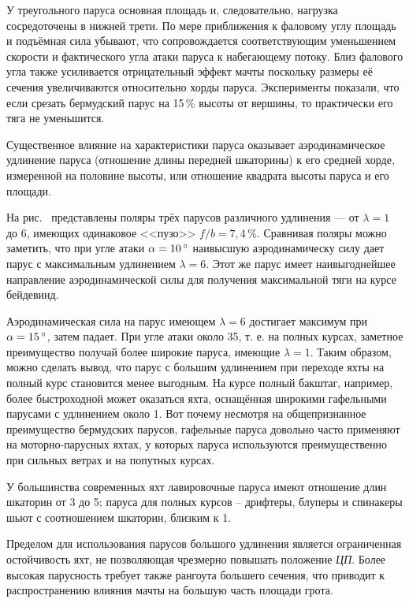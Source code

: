 У треугольного паруса основная площадь и, следовательно, нагрузка сосредоточены в нижней трети. По мере приближения к фаловому углу площадь и подъёмная сила убывают, что сопровождается соответствующим уменьшением скорости и фактического угла атаки паруса к набегающему потоку. Близ фалового угла также усиливается отрицательный эффект мачты поскольку размеры её сечения увеличиваются относительно хорды паруса. Эксперименты показали, что если срезать бермудский парус на 15\,\% высоты от вершины, то практически его тяга не уменьшится. 

Существенное влияние на характеристики паруса оказывает аэродинамическое удлинение паруса (отношение длины передней шкаторины) к его средней хорде, измеренной на половине высоты, или отношение квадрата высоты паруса и его площади.

На рис.~ представлены поляры трёх парусов различного удлинения --- от $\lambda = 1$ до 6, имеющих одинаковое <<пузо>> $f/b=7,4\,\%$. Сравнивая поляры можно заметить, что при угле атаки $\alpha = 10\,^\circ$ наивысшую аэродинамическу силу дает парус с максимальным удлинением $\lambda = 6$. Этот же парус имеет наивыгоднейшее направление аэродинамической силы для получения максимальной тяги на курсе бейдевинд. 

Аэродинамическая сила на парус имеющем $\lambda = 6$ достигает максимум при $\alpha = 15\,^\circ$, затем падает. При угле атаки около 35\gr, т. е. на полных курсах, заметное преимущество получай более широкие паруса, имеющие $\lambda = 1$. Таким образом, можно сделать вывод, что парус с большим удлинением при переходе яхты на полный курс становится менее выгодным. На курсе полный бакштаг, например, более быстроходной может оказаться яхта, оснащённая широкими гафельными парусами с удлинением около 1. Вот почему несмотря на общепризнанное преимущество бермудских парусов, гафельные паруса довольно часто применяют на моторно-парусных яхтах, у которых паруса используются преимущественно при сильных ветрах и на попутных курсах. 

У большинства современных яхт лавировочные паруса имеют отношение длин шкаторин от 3 до 5; паруса для полных курсов \--- дрифтеры, блуперы и спинакеры шьют с соотношением шкаторин, близким к 1.

Пределом для использования парусов большого удлинения является ограниченная остойчивость яхт, не позволяющая чрезмерно повышать положение \textit{ЦП}. Более высокая парусность требует также рангоута большего сечения, что приводит к распространению влияния мачты на большую часть площади грота.

